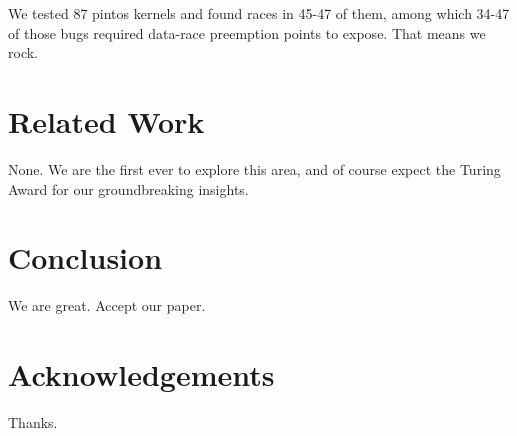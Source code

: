 \documentclass[pldi]{sigplanconf-pldi15}
\begin{document}
We tested 87 pintos kernels and found races in 45-47 of them, among which 34-47 of those bugs required data-race preemption points to expose. That means we rock.



\section{Related Work}

None. We are the first ever to explore this area, and of course expect the Turing Award for our groundbreaking insights.







\section{Conclusion}

We are
great. Accept our paper.


\section{Acknowledgements}

Thanks.


{}
\end{document}
